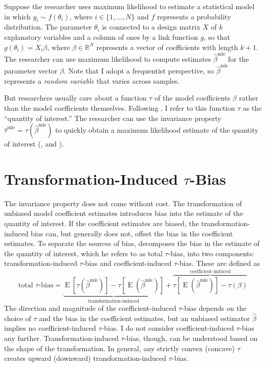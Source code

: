 \documentclass[10pt]{article}
\DeclareMathOperator*{\E}{\text{E}}
\begin{document}
\onehalfspace

Suppose the researcher uses maximum likelihood to estimate a statistical model in which $y_i \sim f(\theta_i)$, where $i \in \{1,..., N\}$ and $f$ represents a probability distribution. 
The parameter $\theta_i$ is connected to a design matrix $X$ of $k$ explanatory variables and a column of ones by a link function $g$, so that $g(\theta_i) = X_i\beta$, where $\beta \in \mathbb{R}^N$ represents a vector of coefficients with length $k + 1$. 
The researcher can use maximum likelihood to compute estimates $\hat{\beta}^{\text{mle}}$ for the parameter vector $\beta$.
Note that I adopt a frequentist perspective, so $\hat{\beta}^{\text{mle}}$ represents a \emph{random variable} that varies across samples.

But researchers usually care about a function $\tau$ of the model coefficients $\beta$ rather than the model coefficients themselves. 
Following \cite{KingTomzWittenberg2000}, I refer to this function $\tau$ as the ``quantity of interest.''
The researcher can use the invariance property $\hat{\tau}^{\text{mle}} = \tau \left( \hat{\beta}^{\text{mle}}\right)$ to quickly obtain a maximum likelihood estimate of the quantity of interest (\citealt[pp. 75-76]{King1989}, and \citealt[pp. 320-321]{CasellaBerger2002}).

\section*{Transformation-Induced $\tau$-Bias}

The invariance property does not come without cost. 
The transformation of unbiased model coefficient estimates introduces bias into the estimate of the quantity of interest. 
If the coefficient estimates are biased, the transformation-induced bias can, but generally does not, offset the bias in the coefficient estimates. 
To separate the sources of bias, \citet[p. 404]{Rainey2017} decomposes the bias in the estimate of the quantity of interest, which he refers to as total $\tau$-bias, into two components: transformation-induced $\tau$-bias and coefficient-induced $\tau$-bias. These are defined as
\begin{equation}
\text{total } \tau\text{-bias}= \underbrace{ \E[\tau(\hat{\beta}^\text{mle})]-  \tau[\E(\hat{\beta}^\text{mle})]  }_{\text{transformation-induced}} + \overbrace{  \tau[\E(\hat{\beta}^\text{mle})] - \tau(\beta)  }^{\text{coefficient-induced}}\text{} \label{eqn:ti-bias}
\end{equation}
The direction and magnitude of the coefficient-induced $\tau$-bias depends on the choice of $\tau$ and the bias in the coefficient estimates, but an unbiased estimator $\hat{\beta}$ implies no coefficient-induced $\tau$-bias.
I do not consider coefficient-induced $\tau$-bias any further. 
Transformation-induced $\tau$-bias, though, can be understood based on the shape of the transformation. 
In general, any strictly convex (concave) $\tau$ creates upward (downward) transformation-induced $\tau$-bias. 
\end{document}
